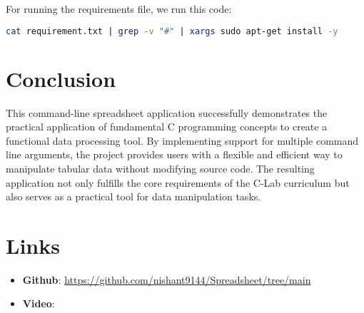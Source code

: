 \documentclass{article}
\begin{document}

For running the requirements file, we run this code:
\begin{lstlisting}[language=bash]
cat requirement.txt | grep -v "#" | xargs sudo apt-get install -y
\end{lstlisting}

\section{Conclusion}
This command-line spreadsheet application successfully demonstrates the practical application of fundamental C programming concepts to create a functional data processing tool.
By implementing support for multiple command line arguments, the project provides users
with a flexible and efficient way to manipulate tabular data without modifying source code.
The resulting application not only fulfills the core requirements of the C-Lab curriculum but
also serves as a practical tool for data manipulation tasks.

\section{Links}
\begin{itemize}
    \item \textbf{Github}: \url{https://github.com/nishant9144/Spreadsheet/tree/main}
    \item \textbf{Video}: \url{}
\end{itemize}
\end{document}
